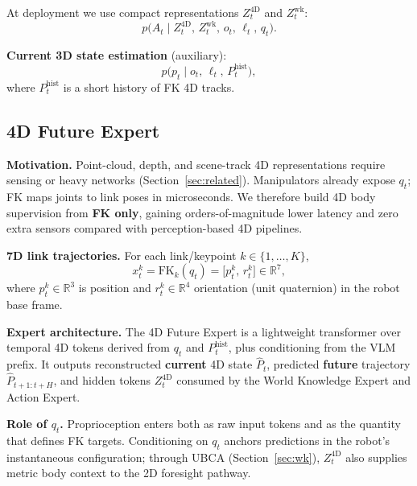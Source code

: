 At deployment we use compact representations $Z^{\mathrm{4D}}_t$ and $Z^{\mathrm{wk}}_t$:
\begin{equation}
p\bigl(A_t \mid Z^{\mathrm{4D}}_t,\, Z^{\mathrm{wk}}_t,\, o_t,\, \ell_t,\, q_t\bigr).
\label{eq:action-deploy}
\end{equation}

\textbf{Current 3D state estimation} (auxiliary):
\begin{equation}
p\bigl(p_t \mid o_t,\, \ell_t,\, P^{\mathrm{hist}}_t\bigr),
\label{eq:cur}
\end{equation}
where $P^{\mathrm{hist}}_t$ is a short history of FK 4D tracks.

\subsection{4D Future Expert}
\label{sec:4d}

\textbf{Motivation.} Point-cloud, depth, and scene-track 4D representations require sensing or heavy networks (Section~\ref{sec:related}). Manipulators already expose $q_t$; FK maps joints to link poses in microseconds. We therefore build 4D body supervision from \textbf{FK only}, gaining orders-of-magnitude lower latency and zero extra sensors compared with perception-based 4D pipelines.

\textbf{7D link trajectories.} For each link/keypoint $k \in \{1,\ldots,K\}$,
\begin{equation}
x^k_t = \mathrm{FK}_k(q_t) = \bigl[p^k_t,\, r^k_t\bigr] \in \mathbb{R}^7,
\label{eq:fk7d}
\end{equation}
where $p^k_t \in \mathbb{R}^3$ is position and $r^k_t \in \mathbb{R}^4$ orientation (unit quaternion) in the robot base frame.

\textbf{Expert architecture.} The 4D Future Expert is a lightweight transformer over temporal 4D tokens derived from $q_t$ and $P^{\mathrm{hist}}_t$, plus conditioning from the VLM prefix. It outputs reconstructed \textbf{current} 4D state $\hat{P}_t$, predicted \textbf{future} trajectory $\hat{P}_{t+1:t+H}$, and hidden tokens $Z^{\mathrm{4D}}_t$ consumed by the World Knowledge Expert and Action Expert.

\textbf{Role of $q_t$.} Proprioception enters both as raw input tokens and as the quantity that defines FK targets. Conditioning on $q_t$ anchors predictions in the robot's instantaneous configuration; through UBCA (Section~\ref{sec:wk}), $Z^{\mathrm{4D}}_t$ also supplies metric body context to the 2D foresight pathway.

